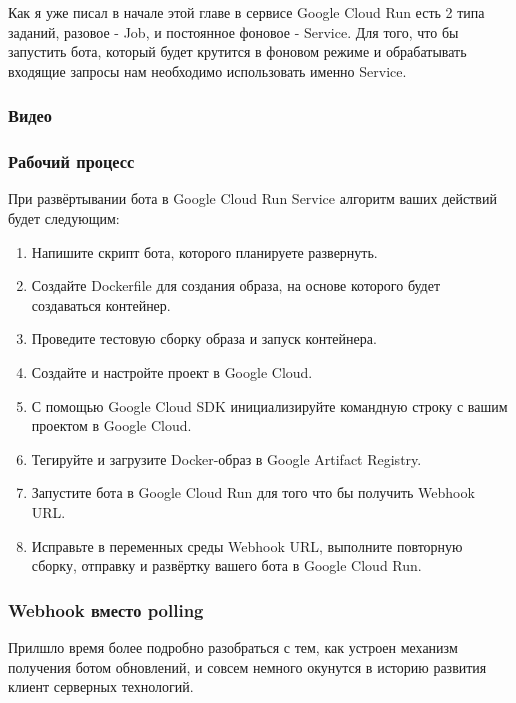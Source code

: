 \documentclass[
]{book}
\providecommand{\tightlist}{%
  \setlength{\itemsep}{0pt}\setlength{\parskip}{0pt}}
\begin{document}
Как я уже писал в начале этой главе в сервисе Google Cloud Run есть 2 типа заданий, разовое - Job, и постоянное фоновое - Service. Для того, что бы запустить бота, который будет крутится в фоновом режиме и обрабатывать входящие запросы нам необходимо использовать именно Service.

\subsubsection{Видео}\label{ux432ux438ux434ux435ux43e-1}

\subsubsection{Рабочий процесс}\label{ux440ux430ux431ux43eux447ux438ux439-ux43fux440ux43eux446ux435ux441ux441}

При развёртывании бота в Google Cloud Run Service алгоритм ваших действий будет следующим:

\begin{enumerate}
\def\labelenumi{\arabic{enumi}.}
\tightlist
\item
  Напишите скрипт бота, которого планируете развернуть.
\item
  Создайте Dockerfile для создания образа, на основе которого будет создаваться контейнер.
\item
  Проведите тестовую сборку образа и запуск контейнера.
\item
  Создайте и настройте проект в Google Cloud.
\item
  С помощью Google Cloud SDK инициализируйте командную строку с вашим проектом в Google Cloud.
\item
  Тегируйте и загрузите Docker-образ в Google Artifact Registry.
\item
  Запустите бота в Google Cloud Run для того что бы получить Webhook URL.
\item
  Исправьте в переменных среды Webhook URL, выполните повторную сборку, отправку и развёртку вашего бота в Google Cloud Run.
\end{enumerate}

\subsubsection{Webhook вместо polling}\label{webhook-ux432ux43cux435ux441ux442ux43e-polling}

Прилшло время более подробно разобраться с тем, как устроен механизм получения ботом обновлений, и совсем немного окунутся в историю развития клиент серверных технологий.
\end{document}
